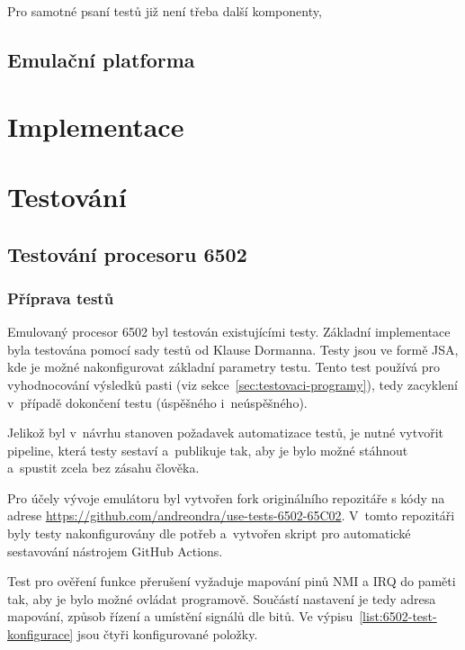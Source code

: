 Pro samotné psaní testů již není třeba další komponenty, 

\section{Emulační platforma}

\chapter{Implementace}

\chapter{Testování}

\section{Testování procesoru 6502}
\subsection{Příprava testů}
Emulovaný procesor 6502 byl testován existujícími testy. Základní implementace byla testována pomocí sady testů od Klause Dormanna. Testy jsou ve formě JSA, kde je možné nakonfigurovat základní parametry testu. Tento test používá pro vyhodnocování výsledků pasti (viz sekce~\ref{sec:testovaci-programy}), tedy zacyklení v~případě dokončení testu (úspěšného i~neúspěšného).

Jelikož byl v~návrhu stanoven požadavek automatizace testů, je nutné vytvořit pipeline, která testy sestaví a~publikuje tak, aby je bylo možné stáhnout a~spustit zcela bez zásahu člověka.

Pro účely vývoje emulátoru byl vytvořen fork originálního repozitáře s kódy na adrese \url{https://github.com/andreondra/use-tests-6502-65C02}. V~tomto repozitáři byly testy nakonfigurovány dle potřeb a~vytvořen skript pro automatické sestavování nástrojem GitHub Actions.

Test pro ověření funkce přerušení vyžaduje mapování pinů NMI a IRQ do paměti tak, aby je bylo možné ovládat programově. Součástí nastavení je tedy adresa mapování, způsob řízení a umístění signálů dle bitů. Ve výpisu~\ref{list:6502-test-konfigurace} jsou čtyři konfigurované položky.

